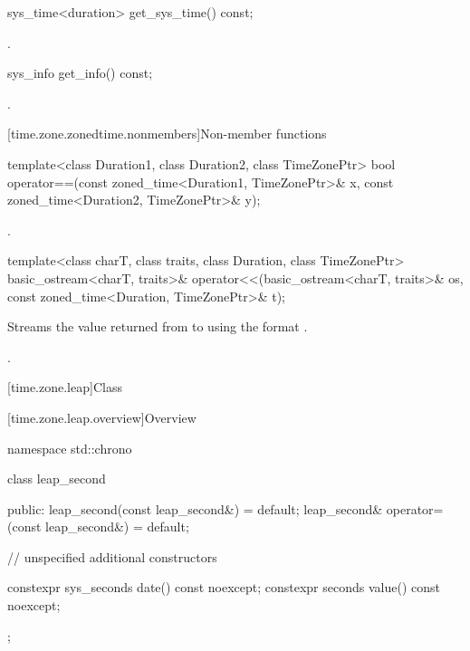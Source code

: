 %
\begin{itemdecl}
sys_time<duration> get_sys_time() const;
\end{itemdecl}

\begin{itemdescr}
\pnum
\returns
{}.
\end{itemdescr}

%
\begin{itemdecl}
sys_info get_info() const;
\end{itemdecl}

\begin{itemdescr}
\pnum
\returns
{}.
\end{itemdescr}

[time.zone.zonedtime.nonmembers]{Non-member functions}

%
\begin{itemdecl}
template<class Duration1, class Duration2, class TimeZonePtr>
  bool operator==(const zoned_time<Duration1, TimeZonePtr>& x,
                  const zoned_time<Duration2, TimeZonePtr>& y);
\end{itemdecl}

\begin{itemdescr}
\pnum
\returns
{}.
\end{itemdescr}

%
\begin{itemdecl}
template<class charT, class traits, class Duration, class TimeZonePtr>
  basic_ostream<charT, traits>&
    operator<<(basic_ostream<charT, traits>& os,
               const zoned_time<Duration, TimeZonePtr>& t);
\end{itemdecl}

\begin{itemdescr}
\pnum
\effects
Streams
the value returned from 
to 
using the format .

\pnum
\returns
{}.
\end{itemdescr}

[time.zone.leap]{Class }

[time.zone.leap.overview]{Overview}

\begin{codeblock}
namespace std::chrono {
  class leap_second {
  public:
    leap_second(const leap_second&)            = default;
    leap_second& operator=(const leap_second&) = default;

    // unspecified additional constructors

    constexpr sys_seconds date() const noexcept;
    constexpr seconds value() const noexcept;
  };
}
\end{codeblock}

